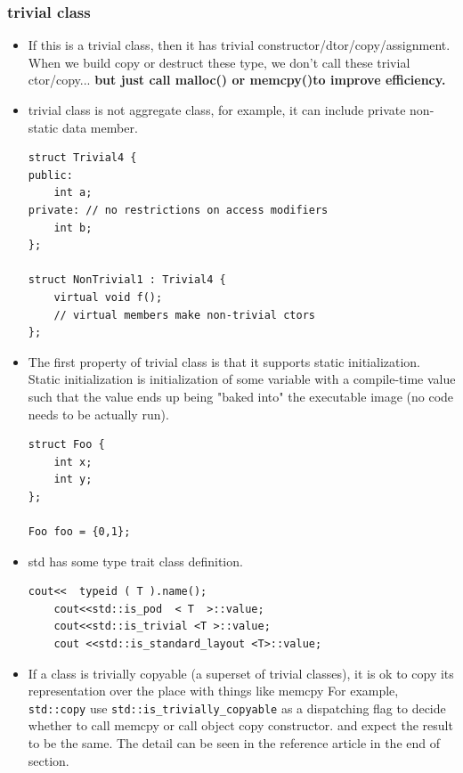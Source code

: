 \documentclass[a4paper,11pt,twoside]{book}
\begin{document}
\subsubsection{trivial class}
\begin{itemize}
	\item If this is a trivial class, then it has trivial constructor/dtor/copy/assignment. When we build copy or destruct these type, we don't call these trivial ctor/copy... \textbf{but just call malloc() or memcpy()to improve efficiency.} 
	
	\item trivial class is not aggregate class, for example, it can include private non-static data member. 
\begin{lstlisting}[numbers=none]
struct Trivial4 {
public:
	int a;
private: // no restrictions on access modifiers
	int b;
};
		
struct NonTrivial1 : Trivial4 {
	virtual void f(); 
	// virtual members make non-trivial ctors
};
\end{lstlisting}
	
	
	\item The first property of trivial class is that it supports static initialization. Static initialization is initialization of some variable with a compile-time value such that the value ends up being "baked into" the executable image (no code needs to be actually run).
\begin{lstlisting}[numbers=none]
struct Foo {
	int x;
	int y;
};
	
Foo foo = {0,1};
\end{lstlisting}

\item std has some type trait class definition. 
\begin{lstlisting}[numbers=none]
	cout<<  typeid ( T ).name();
	cout<<std::is_pod  < T  >::value;
	cout<<std::is_trivial <T >::value;
	cout <<std::is_standard_layout <T>::value;
\end{lstlisting}
	
	\item If a class is trivially copyable (a superset of trivial classes), it is ok to copy its representation over the place with things like memcpy For example, \texttt{std::copy} use \texttt{std::is\_trivially\_copyable} as a dispatching flag to decide whether to call memcpy or call object copy constructor. and expect the result to be the same. The detail can be seen in the reference article in the end of section. 
	

\end{itemize}
\end{document}

